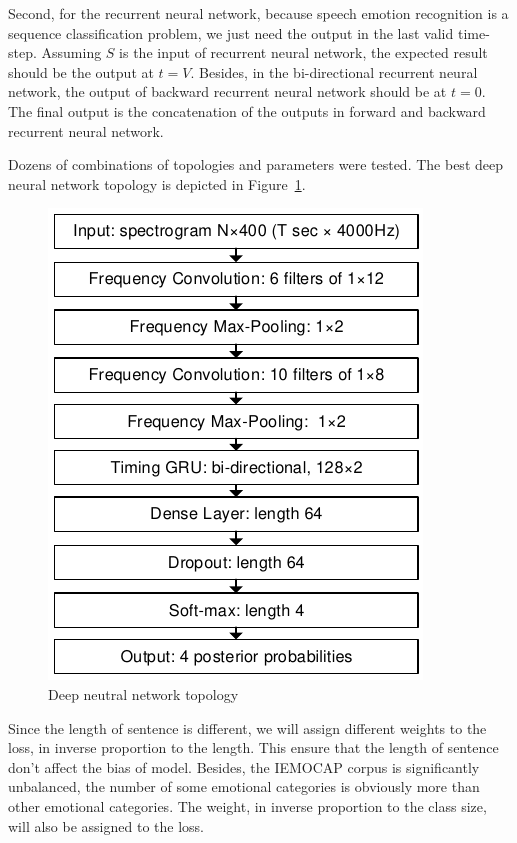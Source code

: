 \documentclass[a4paper]{article}
\begin{document}
Second, for the recurrent neural network, because speech emotion recognition is a sequence classification problem, we just need the output in the last valid time-step. Assuming $S$ is the input of recurrent neural network, the expected result should be the output at $t=V$. Besides, in the bi-directional recurrent neural network, the output of backward recurrent neural network should be at $t=0$. The final output is the concatenation of the outputs in forward and backward recurrent neural network.

Dozens of combinations of topologies and parameters were tested. The best deep neural network topology is depicted in Figure~\ref{fig:network}.

\begin{figure}[!htb]
\centering
\centerline{\includegraphics{network}}
\caption{Deep neutral network topology}
\label{fig:network}
\end{figure}

Since the length of sentence is different, we will assign different weights to the loss, in inverse proportion to the length. This ensure that the length of sentence don't affect the bias of model. Besides, the IEMOCAP corpus is significantly unbalanced, the number of some emotional categories is obviously more than other emotional categories. The weight, in inverse proportion to the class size, will also be assigned to the loss.
\end{document}
